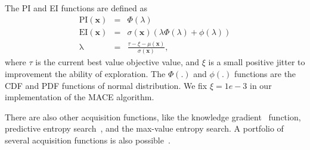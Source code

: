 The PI and EI functions are defined as
\begin{equation}
    \label{eq:PI_EI}
    \begin{array}{lll}
        \mathrm{PI}(\bm{x}) &=& \Phi(\lambda) \\
        \mathrm{EI}(\bm{x}) &=& \sigma(\bm{x}) (\lambda \Phi(\lambda) + \phi(\lambda))     \\
        \mathrm{\lambda}    &=& \displaystyle \frac{\tau - \xi - \mu(\bm{x})}{\sigma(\bm{x})},
    \end{array}
\end{equation}
where $\tau$ is the current best value objective value, and $\xi$ is a small positive jitter to improvement the ability of exploration. The $\Phi(.)$ and $\phi(.)$ functions are the CDF and PDF functions of normal distribution. We fix $\xi = 1e-3$ in our implementation of the MACE algorithm.


There are also other acquisition functions, like the knowledge gradient~\cite{scott2011correlated} function, predictive entropy search~\cite{hernandez2014predictive}, and the max-value entropy search\cite{wang2017max}. A portfolio of several acquisition functions is also possible~\cite{hoffman2011portfolio}.
